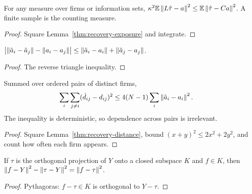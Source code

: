 \begin{lemma}\label{thm:recovery-mean}
  \leanok
  For any measure over firms or information sets,
  $\kappa^2\mathbb{E}\left\lVert L\hat\tau-a\right\rVert^2\le\mathbb{E}\left\lVert\hat\tau-Ca\right\rVert^2$. A finite sample is
  the counting measure.
\end{lemma}
\begin{proof}\leanok
  Square Lemma~\ref{thm:recovery-exposure} and integrate.
\end{proof}

\begin{lemma}\label{thm:recovery-distance}
  \leanok
  $\bigl\lvert\left\lVert\hat a_i-\hat a_j\right\rVert-\left\lVert a_i-a_j\right\rVert\bigr\rvert
  \le\left\lVert\hat a_i-a_i\right\rVert+\left\lVert\hat a_j-a_j\right\rVert$.
\end{lemma}
\begin{proof}\leanok
  The reverse triangle inequality.
\end{proof}

\begin{theorem}\label{thm:recovery-pairwise}
  \leanok
  Summed over ordered pairs of distinct firms,
  \[
    \sum_i\sum_{j\ne i}(\hat
    d_{ij}-d_{ij})^2\le4(N-1)\sum_i\left\lVert\hat a_i-a_i\right\rVert^2.
  \]
  The inequality is deterministic, so dependence across pairs is irrelevant.
\end{theorem}
\begin{proof}\leanok
  Square Lemma~\ref{thm:recovery-distance}, bound $(x+y)^2\le2x^2+2y^2$, and
  count how often each firm appears.
\end{proof}

\begin{lemma}\label{thm:recovery-excess}
  \leanok
  If $\tau$ is the orthogonal projection of $Y$ onto a closed subspace $K$ and
  $f\in K$, then $\left\lVert f-Y\right\rVert^2-\left\lVert\tau-Y\right\rVert^2=\left\lVert f-\tau\right\rVert^2$.
\end{lemma}
\begin{proof}\leanok
  Pythagoras: $f-\tau\in K$ is orthogonal to $Y-\tau$.
\end{proof}

